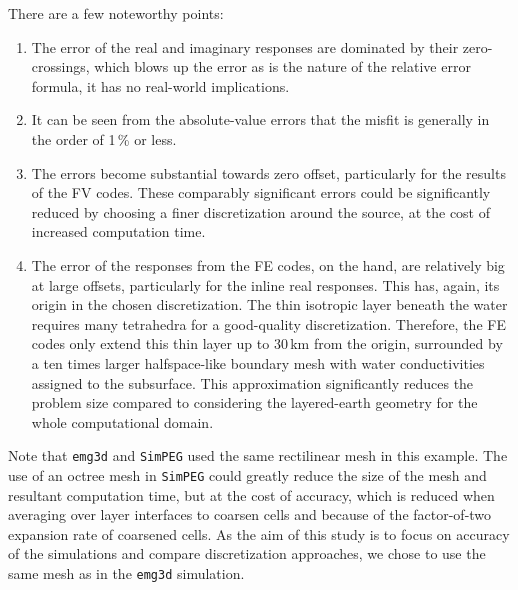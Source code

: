 \documentclass[onecolumn,extra,camera]{gji}
\newcommand{\emg}[2]{\texttt{emg#1#2}\xspace}
\newcommand{\simpeg}{\texttt{SimPEG}\xspace}
\begin{document}
There are a few noteworthy points:
\begin{enumerate}
  \item The error of the real and imaginary responses are dominated by their zero-crossings, which blows up the error as is the nature of the relative error formula, it has no real-world implications.
  \item It can be seen from the absolute-value errors that the misfit is generally in the order of 1\,\% or less.
  \item The errors become substantial towards zero offset, particularly for the results of the FV codes. These comparably significant errors could be significantly reduced by choosing a finer discretization around the source, at the cost of increased computation time.
  \item The error of the responses from the FE codes, on the hand, are relatively big at large offsets, particularly for the inline real responses. This has, again, its origin in the chosen discretization. The thin isotropic layer beneath the water requires many tetrahedra for a good-quality discretization. Therefore, the FE codes only extend this thin layer up to 30\,km from the origin, surrounded by a ten times larger halfspace-like boundary mesh with water conductivities assigned to the subsurface. This approximation significantly reduces the problem size compared to considering the layered-earth geometry for the whole computational domain.
\end{enumerate}

Note that \emg3d and \simpeg used the same rectilinear mesh in this example. The use of an octree mesh in \simpeg could greatly reduce the size of the mesh and resultant computation time, but at the cost of accuracy, which is reduced when averaging over layer interfaces to coarsen cells and because of the factor-of-two expansion rate of coarsened cells. As the aim of this study is to focus on accuracy of the simulations and compare discretization approaches, we chose to use the same mesh as in the \emg3d simulation.
\end{document}
